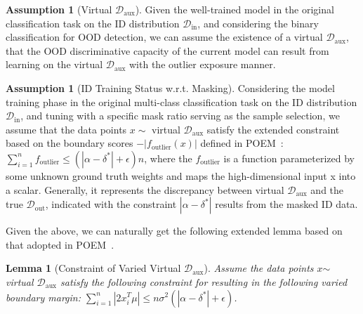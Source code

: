 \documentclass{article}
\theoremstyle{plain}
\newtheorem{lemma}[theorem]{Lemma}
\theoremstyle{definition}
\newtheorem{assumption}[theorem]{Assumption}
\theoremstyle{remark}
\begin{document}
\begin{assumption}[Virtual $\mathcal{D}_\text{aux}$]
Given the well-trained model in the original classification task on the ID distribution $\mathcal{D}_\text{in}$, and considering the binary classification for OOD detection, we can assume the existence of a virtual $\mathcal{D}_\text{aux}$, that the OOD discriminative capacity of the current model can result from learning on the virtual $\mathcal{D}_\text{aux}$ with the outlier exposure manner.
\label{assump:daux}
\end{assumption}

\begin{assumption}[ID Training Status w.r.t. Masking]
Considering the model training phase in the original multi-class classification task on the ID distribution $\mathcal{D}_\text{in}$, and tuning with a specific mask ratio serving as the sample selection, we assume that the data points $x\sim$ virtual $\mathcal{D}_\text{aux}$ satisfy the extended constraint based on the boundary scores $-|f_\text{outlier}(x)|$ defined in POEM~\cite{ming2022poem}: $\sum^{n}_{i=1}f_\text{outlier}\leq (|\alpha-\delta^*|+\epsilon)n$, where the $f_\text{outlier}$ is a function parameterized by some unknown ground truth weights and maps the high-dimensional input x into a scalar. Generally, it represents the discrepancy between virtual $\mathcal{D}_\text{aux}$ and the true $\mathcal{D}_\text{out}$, indicated with the constraint $|\alpha-\delta^*|$ results from the masked ID data.
\label{assump:masking}
\end{assumption}

Given the above, we can naturally get the following extended lemma based on that adopted in POEM~\citep{ming2022poem}.

\begin{lemma}[Constraint of Varied Virtual $\mathcal{D}_\text{aux}$]
\label{app: lemma1}
Assume the data points $x$$\sim$ virtual $\mathcal{D}_\text{aux}$ satisfy the following constraint for resulting in the following varied boundary margin: $\sum_{i=1}^n|2x_i^T\mu|\leq n \sigma^2 (|\alpha-\delta^*|+\epsilon)$. 
\end{lemma}
\end{document}
